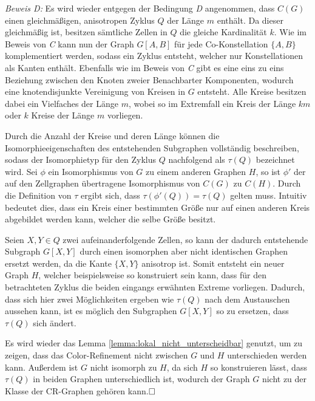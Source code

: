 \emph{Beweis D:} Es wird wieder entgegen der Bedingung \emph{D} angenommen, dass $C(G)$ einen gleichmäßigen, anisotropen Zyklus $Q$ der Länge $m$ enthält.
Da dieser gleichmäßig ist, besitzen sämtliche Zellen in $Q$ die gleiche Kardinalität $k$.
Wie im Beweis von \emph{C} kann nun der Graph $G[A,B]$ für jede Co-Konstellation $\{A,B\}$ komplementiert werden, sodass ein Zyklus entsteht, welcher nur Konstellationen als Kanten enthält.
Ebenfalls wie im Beweis von \emph{C} gibt es eine eins zu eins Beziehung zwischen den Knoten zweier Benachbarter Komponenten, wodurch eine knotendisjunkte Vereinigung von Kreisen in $G$ entsteht.
Alle Kreise besitzen dabei ein Vielfaches der Länge $m$, wobei so im Extremfall ein Kreis der Länge $km$ oder $k$ Kreise der Länge $m$ vorliegen.

Durch die Anzahl der Kreise und deren Länge können die Isomorphieeigenschaften des entstehenden Subgraphen vollständig beschreiben, sodass der Isomorphietyp für den Zyklus $Q$ nachfolgend als $\tau (Q)$ bezeichnet wird.
Sei $\phi $ ein Isomorphismus von $G$ zu einem anderen Graphen $H$, so ist $\phi '$ der auf den Zellgraphen übertragene Isomorphismus von $C(G)$ zu $C(H)$.
Durch die Definition von $\tau $ ergibt sich, dass $\tau (\phi '(Q))=\tau (Q)$ gelten muss.
Intuitiv bedeutet dies, dass ein Kreis einer bestimmten Größe nur auf einen anderen Kreis abgebildet werden kann, welcher die selbe Größe besitzt.

Seien $X,Y\in Q$ zwei aufeinanderfolgende Zellen, so kann der dadurch entstehende Subgraph $G[X,Y]$ durch einen isomorphen aber nicht identischen Graphen ersetzt werden, da die Kante $\{X,Y\}$ anisotrop ist.
Somit entsteht ein neuer Graph $H$, welcher beispielsweise so konstruiert sein kann, dass für den betrachteten Zyklus die beiden eingangs erwähnten Extreme vorliegen.
Dadurch, dass sich hier zwei Möglichkeiten ergeben wie $\tau (Q)$ nach dem Austauschen aussehen kann, ist es möglich den Subgraphen $G[X,Y]$ so zu ersetzen, dass $\tau (Q)$ sich ändert.

Es wird wieder das Lemma \ref{lemma:lokal_nicht_unterscheidbar} genutzt, um zu zeigen, dass das Color-Refinement nicht zwischen $G$ und $H$ unterschieden werden kann.
Außerdem ist $G$ nicht isomorph zu $H$, da sich $H$ so konstruieren lässt, dass $\tau (Q)$ in beiden Graphen unterschiedlich ist, wodurch der Graph $G$ nicht zu der Klasse der CR-Graphen gehören kann.$\hfill\square$\\

